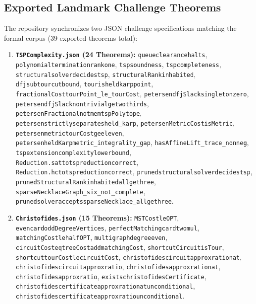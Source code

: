 \documentclass[11pt,a4paper]{article}
\renewcommand{\_}{\origunderscore\allowbreak}
\theoremstyle{plain}
\theoremstyle{definition}
\theoremstyle{remark}
\begin{document}
\subsection{Exported Landmark Challenge Theorems}
The repository synchronizes two JSON challenge specifications matching the formal corpus (39 exported theorems total):
\begin{enumerate}
  \item \textbf{\texttt{TSPComplexity.json} (24 Theorems):} \texttt{queue\_clearance\_halts}, \texttt{polynomial\_termination\_rank\_one}, \texttt{tsp\_soundness}, \texttt{tsp\_completeness}, \texttt{structural\_solver\_decides\_tsp}, \texttt{structural\allowbreak Rank\_inhabited}, \texttt{dfj\_subtour\_cut\_bound}, \texttt{tour\_is\_held\_karp\_point}, \texttt{fractionalCost\_tourPoint_le_tourCost}, \texttt{petersen\_dfjSlack\_singleton\_zero}, \texttt{petersen\_dfjSlack\_nontrivial\_ge\_two\_thirds}, \texttt{petersenFractional\_not\_mem\_tspPolytope}, \texttt{petersen\_strictly\_separates\_held_karp}, \texttt{petersenMetricCost\_isMetric}, \texttt{petersen\_metric\_tourCost\_ge\_eleven}, \texttt{petersen\_heldKarp\_metric_integrality_gap}, \texttt{hasAffineLift_trace_nonneg}, \texttt{tsp\_extension\_complexity\_lower\_bound}, \texttt{Reduction.\allowbreak sat\_to\_tsp\_reduction\_correct}, \texttt{Reduction.\allowbreak hc\_to\_tsp\_reduction\_correct}, \texttt{pruned\_structural\_solver\_decides\_tsp}, \texttt{pruned\allowbreak Structural\allowbreak Rank\_inhabited\_all\_ge\_three}, \texttt{sparseNecklaceGraph_six_not_complete}, \texttt{pruned\_solver\_accepts\_sparseNecklace_all\_ge\_three}.
  \item \textbf{\texttt{Christofides.json} (15 Theorems):} \texttt{MSTCost\_le\_OPT}, \texttt{even\_card\_odd\allowbreak Degree\allowbreak Vertices}, \texttt{perfect\allowbreak Matching\_card\_two\_mul}, \texttt{matching\allowbreak Cost\_le\_half\_OPT}, \texttt{multigraph\_degree\_even}, \texttt{circuit\allowbreak Cost\_eq\_tree\allowbreak Cost\_add\_matching\allowbreak Cost}, \texttt{shortcut\allowbreak Circuit\_is\allowbreak Tour}, \texttt{shortcut\_tourCost\_le\_circuitCost}, \texttt{christofides\_circuit\_approx\_ratio\_nat}, \texttt{christofides\_circuit\_approx\_ratio}, \texttt{christofides\_approx\_ratio\_nat}, \texttt{christofides\_approx\_ratio}, \texttt{exists\_christofidesCertificate}, \texttt{christofides\_certificate\_approx\_ratio\_nat\_unconditional}, \texttt{christofides\_certificate\_approx\_ratio\_unconditional}.
\end{enumerate}
\end{document}
